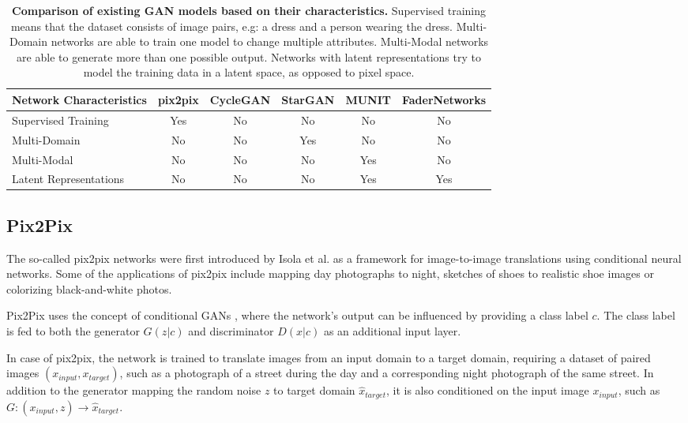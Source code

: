 \documentclass{article}
\begin{document}
\begin{table}
\centering
\begin{tabular}{l*{5}{c}}
Network Characteristics & pix2pix &	CycleGAN & StarGAN	& MUNIT	& FaderNetworks \\
\hline
Supervised Training		& Yes & No & No & No & No \\
Multi-Domain  			& No  & No & Yes & No & No \\
Multi-Modal				& No & No & No & Yes & No \\
Latent Representations	& No & No & No & Yes & Yes \\
\end{tabular}
\caption{\label{tab:gan_comp}\textbf{Comparison of existing GAN models based on their characteristics.} Supervised training means that the dataset consists of image pairs, e.g: a dress and a person wearing the dress. Multi-Domain networks are able to train one model to change multiple attributes. Multi-Modal networks are able to generate more than one possible output. Networks with latent representations try to model the training data in a latent space, as opposed to pixel space.}
\end{table}

\subsection{Pix2Pix}
The so-called pix2pix networks were first introduced by Isola et al. \cite{isola_image--image_2016} as a framework for image-to-image translations using conditional neural networks. Some of the applications of pix2pix include mapping day photographs to night, sketches of shoes to realistic shoe images or colorizing black-and-white photos.

Pix2Pix uses the concept of conditional GANs \cite{mirza_conditional_2014}, where the network's output can be influenced by providing a class label $c$. The class label is fed to both the generator $G(z|c)$ and discriminator $D(x|c)$ as an additional input layer.

In case of pix2pix, the network is trained to translate images from an input domain to a target domain, requiring a dataset of paired images $(x_{input}, x_{target})$, such as a photograph of a street during the day and a corresponding night photograph of the same street. In addition to the generator mapping the random noise $z$ to target domain $\hat{x}_{target}$, it is also conditioned on the input image $x_{input}$, such as $G: (x_{input}, z) \rightarrow \hat{x}_{target}$.
\end{document}
